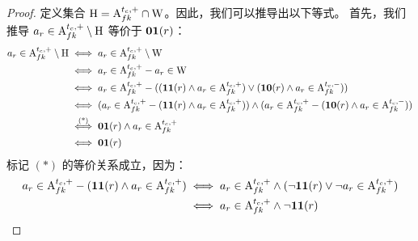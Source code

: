\begin{proof}
定义集合 $\mathrm{H} = {\mathrm{A}_{fk}^{t_c,+}} \cap \mathrm{W}$。因此，我们可以推导出以下等式。
首先，我们推导 $a_r\in{\mathrm{A}_{fk}^{t_c,+}}\setminus\mathrm{H}$ 等价于 $\textbf{0$$1}({r})$：
\begin{equation*}
\begin{aligned}
    a_r\in{\mathrm{A}_{fk}^{t_c,+}}\setminus\mathrm{H}
    & \iff a_r\in{\mathrm{A}_{fk}^{t_c,+}}\setminus\mathrm{W} \\
    & \iff a_r\in{\mathrm{A}_{fk}^{t_c,+}} - a_r\in\mathrm{W} \\
    & \iff a_r\in{\mathrm{A}_{fk}^{t_c,+}} - ((\textbf{1$$1}({r}) \wedge a_r\in{\mathrm{A}_{fk}^{t_c,+}}) \vee (\textbf{1$$0}({r}) \wedge a_r\in{\mathrm{A}_{fk}^{t_c,-}})) \\
    & \iff
    (a_r\in{\mathrm{A}_{fk}^{t_c,+}} - (\textbf{1$$1}({r}) \wedge a_r\in{\mathrm{A}_{fk}^{t_c,+}}))
    \wedge
    (a_r\in{\mathrm{A}_{fk}^{t_c,+}} - (\textbf{1$$0}({r}) \wedge a_r\in{\mathrm{A}_{fk}^{t_c,-}}))
    \\
    &
    \overset{\text{(*)}}{\iff}
    \textbf{0$$1}({r}) \wedge a_r\in{\mathrm{A}_{fk}^{t_c,+}} \\
    & \iff \textbf{0$$1}({r})
\end{aligned}
\end{equation*}
标记 $(*)$ 的等价关系成立，因为：
\begin{equation*}
\begin{aligned}
    a_r\in\arcPosi - (\srr{r} \wedge a_r\in\arcPosi) 
    &\iff a_r\in\arcPosi \wedge (\neg\srr{r} \vee \neg a_r\in\arcPosi) \\
    &\iff a_r\in\arcPosi \wedge \neg\srr{r} \\

\end{aligned}
\end{equation*}
\end{proof}
